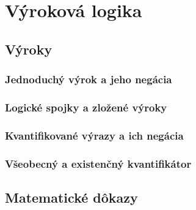 \chapter{Výroková logika}
\label{chap:logika}

\section{Výroky}

\subsection{Jednoduchý výrok a jeho negácia}

\subsection{Logické spojky a zložené výroky}

\subsection{Kvantifikované výrazy a ich negácia}

\subsection{Všeobecný a existenčný kvantifikátor}

\section{Matematické dôkazy}

